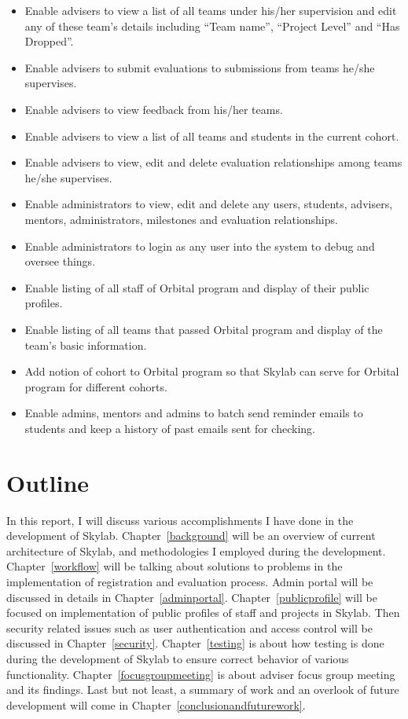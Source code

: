 \begin{itemize}
  \item Enable advisers to view a list of all teams under his/her supervision and edit any of these team's details including ``Team name'', ``Project Level'' and ``Has Dropped''.
  \item Enable advisers to submit evaluations to submissions from teams he/she supervises.
  \item Enable advisers to view feedback from his/her teams.
  \item Enable advisers to view a list of all teams and students in the current cohort.
  \item Enable advisers to view, edit and delete evaluation relationships among teams he/she supervises.
  \item Enable administrators to view, edit and delete any users, students, advisers, mentors, administrators, milestones and evaluation relationships.
  \item Enable administrators to login as any user into the system to debug and oversee things.
  \item Enable listing of all staff of Orbital program and display of their public profiles.
  \item Enable listing of all teams that passed Orbital program and display of the team's basic information.
  \item Add notion of cohort to Orbital program so that Skylab can serve for Orbital program for different cohorts.
  \item Enable admins, mentors and admins to batch send reminder emails to students and keep a history of past emails sent for checking.
\end{itemize}

\section{Outline}

In this report, I will discuss various accomplishments I have done in the development of Skylab. Chapter~\ref{background} will be an overview of current architecture of Skylab, and methodologies I employed during the development. Chapter~\ref{workflow} will be talking about solutions to problems in the implementation of registration and evaluation process. Admin portal will be discussed in details in Chapter~\ref{adminportal}. Chapter~\ref{publicprofile} will be focused on implementation of public profiles of staff and projects in Skylab. Then security related issues such as user authentication and access control will be discussed in Chapter~\ref{security}. Chapter~\ref{testing} is about how testing is done during the development of Skylab to ensure correct behavior of various functionality. Chapter~\ref{focusgroupmeeting} is about adviser focus group meeting and its findings. Last but not least, a summary of work and an overlook of future development will come in Chapter~\ref{conclusionandfuturework}.
